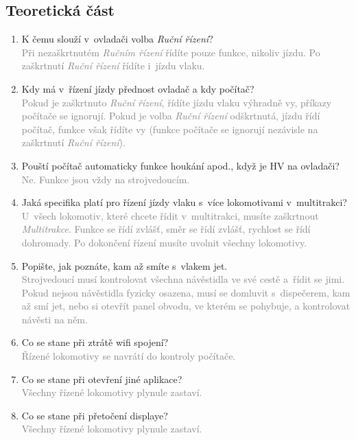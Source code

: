 \documentclass[12pt,a4paper]{article}
\newcommand{\solution}[1]{\\ \textcolor{gray}{#1}}
\newcommand{\solution}[1]{}
\begin{document}
\subsection{Teoretická část}
\begin{enumerate}[leftmargin=*]
\item K čemu slouží v~ovladači volba \textit{Ruční řízení}?
\solution{Při nezaškrtnutém \textit{Ručním řízení} řídíte pouze funkce, nikoliv
jízdu. Po zaškrtnutí \textit{Ruční řízení} řídíte i~jízdu vlaku.}

\item Kdy má v~řízení jízdy přednost ovladač a kdy počítač?
\solution{Pokud je zaškrtnuto \textit{Ruční řízení}, řídíte jízdu vlaku
výhradně vy, příkazy počítače se ignorují. Pokud je volba \textit{Ruční řízení}
odškrtnutá, jízdu řídí počítač, funkce však řídíte vy (funkce počítače se
ignorují nezávisle na zaškrtnutí \textit{Ruční řízení}).}

\item Pouští počítač automaticky funkce houkání apod., když je HV na ovladači?
\solution{Ne. Funkce jsou vždy na strojvedoucím.}

\item Jaká specifika platí pro řízení jízdy vlaku s~více lokomotivami v~multitrakci?
\solution{U~všech lokomotiv, které chcete řídit v~multitrakci, musíte
zaškrtnout \textit{Multitrakce}. Funkce se řídí zvlášť, směr se řídí zvlášť,
rychlost se řídí dohromady. Po dokončení řízení musíte uvolnit všechny
lokomotivy.}

\item Popište, jak poznáte, kam až smíte s~vlakem jet.
\solution{Strojvedoucí musí kontrolovat všechna návěstidla ve své cestě a~řídit
se jimi. Pokud nejsou návěstidla fyzicky osazena, musí se domluvit
s~dispečerem, kam až smí jet, nebo si otevřít panel obvodu, ve kterém se
pohybuje, a kontrolovat návěsti na něm.}

\item Co se stane při ztrátě wifi spojení?
\solution{Řízené lokomotivy se navrátí do kontroly počítače.}

\item Co se stane při otevření jiné aplikace?
\solution{Všechny řízené lokomotivy plynule zastaví.}

\item Co se stane při přetočení displaye?
\solution{Všechny řízené lokomotivy plynule zastaví.}

\end{enumerate}
\end{document}
